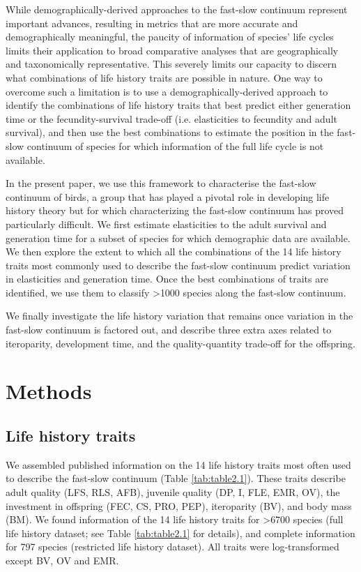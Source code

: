 While demographically-derived approaches to the fast-slow continuum represent
important advances, resulting in metrics that are more accurate and
demographically meaningful, the paucity of information of species’ life cycles
limits their application to broad comparative analyses that are geographically
and taxonomically representative. This severely limits our capacity to discern
what combinations of life history traits are possible in nature. One way to
overcome such a limitation is to use a demographically-derived approach to
identify the combinations of life history traits that best predict either
generation time or the fecundity-survival trade-off (i.e. elasticities to
fecundity and adult survival), and then use the best combinations to estimate
the position in the fast-slow continuum of species for which information of the
full life cycle is not available.

In the present paper, we use this framework to characterise the fast-slow
continuum of birds, a group that has played a pivotal role in developing life
history theory but for which characterizing the fast-slow continuum has proved
particularly difficult. We first estimate elasticities to the adult survival and
generation time for a subset of species for which demographic data are
available. We then explore the extent to which all the combinations of the 14
life history traits most commonly used to describe the fast-slow continuum 
predict variation in elasticities and generation time. Once the best 
combinations of traits are identified, we use them to classify 
\textgreater{1000} species along the fast-slow continuum.

We finally investigate the life history variation that remains once variation
in the fast-slow continuum is factored out, and describe three extra axes
related to iteroparity, development time, and the quality-quantity trade-off for
the offspring.


\section{Methods}

\subsection*{Life history traits}

We assembled published information on the 14 life history traits most often used
to describe the fast-slow continuum (Table \ref{tab:table2.1}). These traits
describe adult quality (LFS, RLS, AFB), juvenile quality (DP, I, FLE, EMR,
OV), the investment in offspring (FEC, CS, PRO, PEP), iteroparity (BV), and body
mass (BM). We found information of the 14 life history traits for 
\textgreater{6700} species (full life history dataset; see Table 
\ref{tab:table2.1} for details), and complete information for 797 species 
(restricted life history dataset). All traits were log-transformed except BV, 
OV and EMR.


